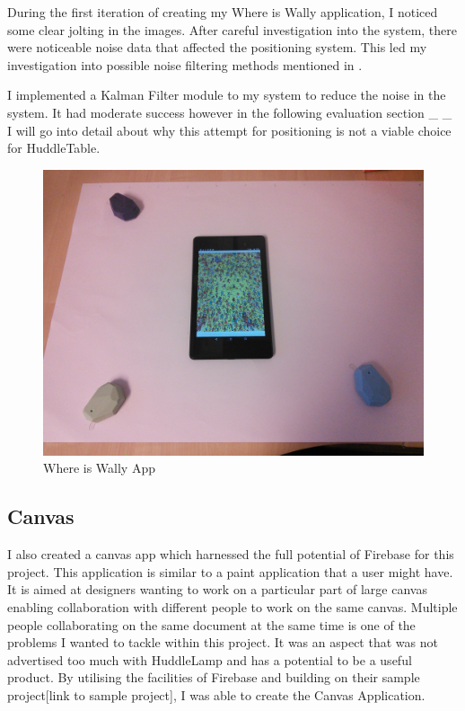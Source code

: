 During the first iteration of creating my Where is Wally application, I noticed some clear jolting in the images. After careful investigation into the system, there were noticeable noise data that affected the positioning system. This led my investigation into possible noise filtering methods mentioned in .

I implemented a Kalman Filter module to my system to reduce the noise in the system. It had moderate success however in the following evaluation section \_ \_ I will go into detail about why this attempt for positioning is not a viable choice for HuddleTable.

\begin{figure}[h]
  \includegraphics[scale=0.2]{images/setup}
  \protect\caption{Where is Wally App} 
  \label{where_is_wally_setup}
\end{figure}

\subsection{Canvas}
I also created a canvas app which harnessed the full potential of Firebase for this project. This application is similar to a paint application that a user might have. It is aimed at designers wanting to work on a particular part of large canvas enabling collaboration with different people to work on the same canvas. Multiple people collaborating on the same document at the same time is one of the problems I wanted to tackle within this project. It was an aspect that was not advertised too much with HuddleLamp and has a potential to be a useful product. 
By utilising the facilities of Firebase and building on their sample project[link to sample project], I was able to create the Canvas Application.


